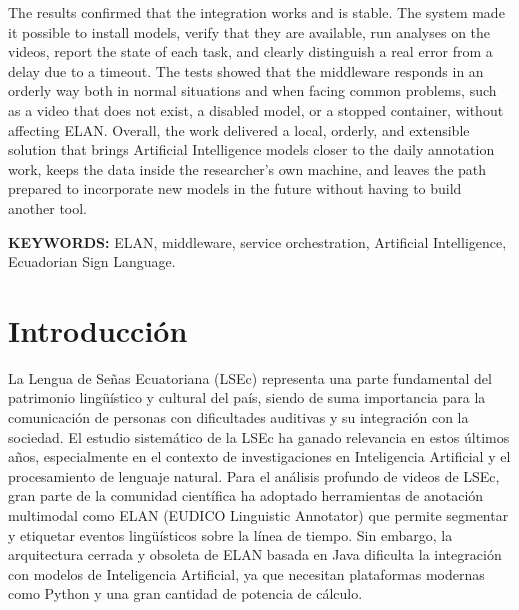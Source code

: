 \documentclass[11pt,a4paper]{article}
\newcounter{frontmatterlastpage}
\begin{document}
The results confirmed that the integration works and is stable. The system made it possible to install models, verify that they are available, run analyses on the videos, report the state of each task, and clearly distinguish a real error from a delay due to a timeout. The tests showed that the middleware responds in an orderly way both in normal situations and when facing common problems, such as a video that does not exist, a disabled model, or a stopped container, without affecting ELAN. Overall, the work delivered a local, orderly, and extensible solution that brings Artificial Intelligence models closer to the daily annotation work, keeps the data inside the researcher's own machine, and leaves the path prepared to incorporate new models in the future without having to build another tool.

\textbf{KEYWORDS:} ELAN, middleware, service orchestration, Artificial Intelligence, Ecuadorian Sign Language.
\setcounter{frontmatterlastpage}{\value{page}}

\clearpage
{}
\setcounter{page}{1}

\section[INTRODUCCIÓN]{Introducción}
La Lengua de Señas Ecuatoriana (LSEc) representa una parte fundamental del patrimonio lingüístico y cultural del país, siendo de suma importancia para la comunicación de personas con dificultades auditivas y su integración con la sociedad. El estudio sistemático de la LSEc ha ganado relevancia en estos últimos años, especialmente en el contexto de investigaciones en Inteligencia Artificial y el procesamiento de lenguaje natural. Para el análisis profundo de videos de LSEc, gran parte de la comunidad científica ha adoptado herramientas de anotación multimodal como ELAN (EUDICO Linguistic Annotator) que permite segmentar y etiquetar eventos lingüísticos sobre la línea de tiempo. Sin embargo, la arquitectura cerrada y obsoleta de ELAN basada en Java dificulta la integración con modelos de Inteligencia Artificial, ya que necesitan plataformas modernas como Python y una gran cantidad de potencia de cálculo.
\end{document}
